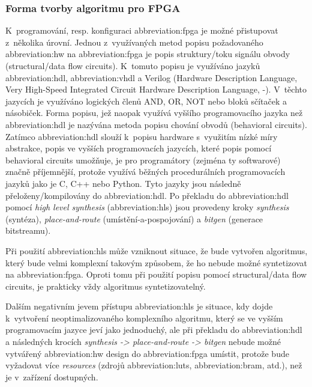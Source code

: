 \documentclass[a4paper, twoside, 11pt]{article}
\begin{document}
		\subsubsection{Forma tvorby algoritmu pro FPGA}\label{subsubsec:forma-tvorby-algoritmu-pro-fpga}
		K~programování, resp. konfiguraci \gls{abbreviation:fpga} je možné přistupovat z~několika úrovní. Jednou z~využívaných metod popisu požadovaného \gls{abbreviation:hw} na \gls{abbreviation:fpga} je popis struktury/toku signálu obvody (structural/data flow circuits). K~tomuto popisu je využíváno jazyků \gls{abbreviation:hdl}, \gls{abbreviation:vhdl} a Verilog (Hardware Description Language, Very High-Speed Integrated Circuit Hardware Description Language, -). V~těchto jazycích je využíváno logických členů AND, OR, NOT nebo bloků sčítaček a násobiček. Forma popisu, jež naopak využívá vyššího programovacího jazyka než \gls{abbreviation:hdl} je nazývána metoda popisu chování obvodů (behavioral circuits). Zatímco \gls{abbreviation:hdl} slouží k~popisu hardware s~využitím nízké míry abstrakce, popis ve vyšších programovacích jazycích, které popis pomocí behavioral circuits umožňuje, je pro programátory (zejména ty softwarové) značně příjemnější, protože využívá běžných procedurálních programovacích jazyků jako je C, C++ nebo Python. Tyto jazyky jsou následně přeloženy/kompilovány do \gls{abbreviation:hdl}. Po překladu do \gls{abbreviation:hdl} pomocí \textit{high level synthesis} (\gls{abbreviation:hls}) jsou provedeny kroky \textit{synthesis} (syntéza), \textit{place-and-route} (umístění-a-pospojování) a \textit{bitgen} (generace bitstreamu). \cite{Sass2010}\par
		Při použití \gls{abbreviation:hls} může vzniknout situace, že bude vytvořen algoritmus, který bude velmi komplexní takovým způsobem, že ho nebude možné syntetizovat na \gls{abbreviation:fpga}. Oproti tomu při použití popisu pomocí structural/data flow circuits, je prakticky vždy algoritmus syntetizovatelný. \cite{Sass2010}\par
		Dalším negativním jevem přístupu \gls{abbreviation:hls} je situace, kdy dojde k~vytvoření neoptimalizovaného komplexního algoritmu, který se ve vyšším programovacím jazyce jeví jako jednoduchý, ale při překladu do \gls{abbreviation:hdl} a následných krocích \textit{synthesis -> place-and-route -> bitgen} nebude možné vytvářený \gls{abbreviation:hw} design do \gls{abbreviation:fpga} umístit, protože bude vyžadovat více \textit{resources} (zdrojů \gls{abbreviation:luts}, \gls{abbreviation:bram}, atd.), než je v~zařízení dostupných.\par
\end{document}
